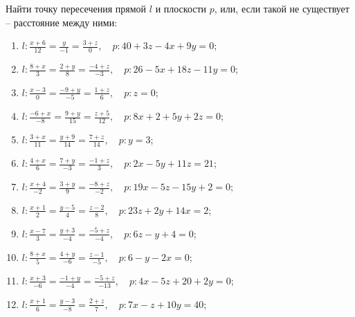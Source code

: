 	\vspace{15pt}
	Найти точку пересечения прямой $l$ и плоскости $p$, или, если такой не существует -- расстояние между ними:

	\begin{enumerate}
		\setcounter{enumi}{\value{tasks}}

			\item \( \displaystyle l: \frac{x+6}{12} = \frac{y}{-1} = \frac{3+z}{0}, \quad p: 40+3z-4x+9y = 0 \);
			\item \( \displaystyle l: \frac{8+x}{3} = \frac{2+y}{8} = \frac{-4+z}{-3}, \quad p: 26-5x+18z-11y = 0 \);
			\item \( \displaystyle l: \frac{x-3}{0} = \frac{-9+y}{-5} = \frac{1+z}{6}, \quad p: z = 0 \);
			\item \( \displaystyle l: \frac{-6+x}{-8} = \frac{9+y}{15} = \frac{z+5}{12}, \quad p: 8x+2+5y+2z = 0 \);
			\item \( \displaystyle l: \frac{3+x}{11} = \frac{y+9}{14} = \frac{7+z}{14}, \quad p: y = 3 \);
			\item \( \displaystyle l: \frac{4+x}{6} = \frac{7+y}{-3} = \frac{-1+z}{3}, \quad p: 2x-5y+11z = 21 \);
			\item \( \displaystyle l: \frac{x+4}{-2} = \frac{3+y}{9} = \frac{-8+z}{-2}, \quad p: 19x-5z-15y+2 = 0 \);
			\item \( \displaystyle l: \frac{x+1}{2} = \frac{y-5}{4} = \frac{z-2}{8}, \quad p: 23z+2y+14x = 2 \);
			\item \( \displaystyle l: \frac{x-7}{3} = \frac{y+3}{-4} = \frac{-5+z}{-4}, \quad p: 6z-y+4 = 0 \);
			\item \( \displaystyle l: \frac{8+x}{5} = \frac{4+y}{-6} = \frac{z-1}{-5}, \quad p: 6-y-2x = 0 \);
			\item \( \displaystyle l: \frac{x+3}{-6} = \frac{-1+y}{-4} = \frac{-5+z}{-13}, \quad p: 4x-5z+20+2y = 0 \);
			\item \( \displaystyle l: \frac{x+1}{6} = \frac{y-3}{-8} = \frac{2+z}{7}, \quad p: 7x-z+10y = 40 \);

		\setcounter{tasks}{\value{enumi}}
	\end{enumerate}

